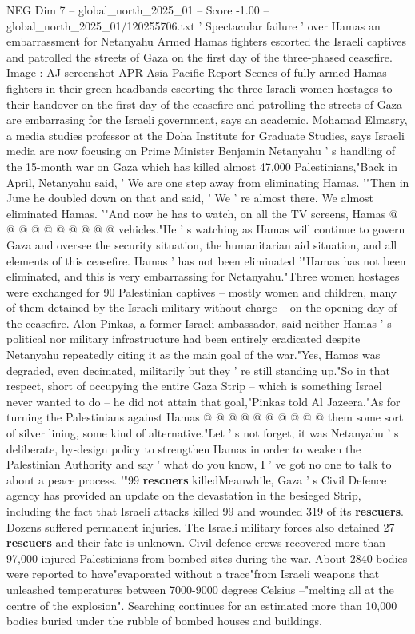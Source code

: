 \begin{textsample}{NEG Dim 7 – global\_north\_2025\_01 – Score -1.00 – global\_north\_2025\_01/120255706.txt}  \label{ex:f7_neg_182}
' Spectacular failure ' over Hamas an embarrassment for Netanyahu Armed Hamas fighters escorted the Israeli captives and patrolled the streets of Gaza on the first day of the three-phased ceasefire.
Image : AJ screenshot APR Asia Pacific Report Scenes of fully armed Hamas fighters in their green headbands escorting the three Israeli women hostages to their handover on the first day of the ceasefire and patrolling the streets of Gaza are embarrasing for the Israeli government, says an academic.
Mohamad Elmasry, a media studies professor at the Doha Institute for Graduate Studies, says Israeli media are now focusing on Prime Minister Benjamin Netanyahu ' s handling of the 15-month war on Gaza which has killed almost 47,000 Palestinians,"Back in April, Netanyahu said, ' We are one step away from eliminating Hamas. '"Then in June he doubled down on that and said, ' We ' re almost there.
We almost eliminated Hamas. '"And now he has to watch, on all the TV screens, Hamas @ @ @ @ @ @ @ @ @ @ vehicles."He ' s watching as Hamas will continue to govern Gaza and oversee the security situation, the humanitarian aid situation, and all elements of this ceasefire.
Hamas ' has not been eliminated '"Hamas has not been eliminated, and this is very embarrassing for Netanyahu."Three women hostages were exchanged for 90 Palestinian captives -- mostly women and children, many of them detained by the Israeli military without charge -- on the opening day of the ceasefire.
Alon Pinkas, a former Israeli ambassador, said neither Hamas ' s political nor military infrastructure had been entirely eradicated despite Netanyahu repeatedly citing it as the main goal of the war."Yes, Hamas was degraded, even decimated, militarily but they ' re still standing up."So in that respect, short of occupying the entire Gaza Strip -- which is something Israel never wanted to do -- he did not attain that goal,"Pinkas told Al Jazeera."As for turning the Palestinians against Hamas @ @ @ @ @ @ @ @ @ @ them some sort of silver lining, some kind of alternative."Let ' s not forget, it was Netanyahu ' s deliberate, by-design policy to strengthen Hamas in order to weaken the Palestinian Authority and say ' what do you know, I ' ve got no one to talk to about a peace process. '"99 \textbf{rescuers} killedMeanwhile, Gaza ' s Civil Defence agency has provided an update on the devastation in the besieged Strip, including the fact that Israeli attacks killed 99 and wounded 319 of its \textbf{rescuers}.
Dozens suffered permanent injuries.
The Israeli military forces also detained 27 \textbf{rescuers} and their fate is unknown.
Civil defence crews recovered more than 97,000 injured Palestinians from bombed sites during the war.
About 2840 bodies were reported to have"evaporated without a trace"from Israeli weapons that unleashed temperatures between 7000-9000 degrees Celsius --"melting all at the centre of the explosion".
Searching continues for an estimated more than 10,000 bodies buried under the rubble of bombed houses and buildings.

\end{textsample}
